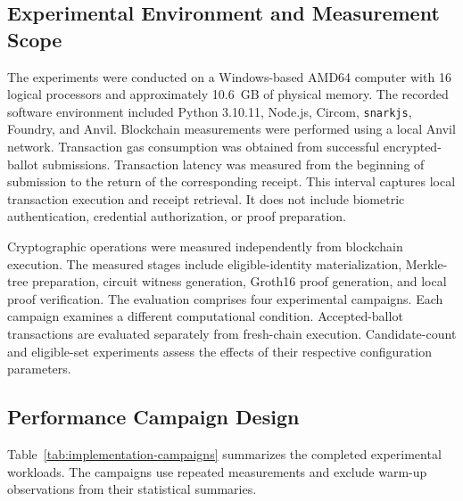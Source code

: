 
\subsection{Experimental Environment and Measurement Scope}
\label{subsec:experimental-environment}



The experiments were conducted on a Windows-based AMD64
computer with 16 logical processors and approximately
10.6~GB of physical memory. The recorded software
environment included Python 3.10.11, Node.js, Circom,
\texttt{snarkjs}, Foundry, and Anvil.
Blockchain measurements were performed using a local
Anvil network. Transaction gas consumption was obtained
from successful encrypted-ballot submissions. Transaction
latency was measured from the beginning of submission
to the return of the corresponding receipt. This interval
captures local transaction execution and receipt retrieval.
It does not include biometric authentication, credential
authorization, or proof preparation.

Cryptographic operations were measured independently
from blockchain execution. The measured stages include
eligible-identity materialization, Merkle-tree preparation,
circuit witness generation, Groth16 proof generation,
and local proof verification.
The evaluation comprises four experimental campaigns.
Each campaign examines a different computational
condition. Accepted-ballot transactions are evaluated
separately from fresh-chain execution. Candidate-count
and eligible-set experiments assess the effects of
their respective configuration parameters.

\subsection{Performance Campaign Design}
\label{subsec:experimental-campaigns}



Table~\ref{tab:implementation-campaigns} summarizes
the completed experimental workloads. The campaigns
use repeated measurements and exclude warm-up
observations from their statistical summaries.

